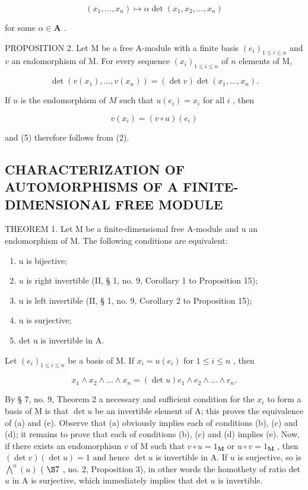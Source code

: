 \[
(x _ {1}, \dots , x _ {n}) \mapsto \alpha \det (x _ {1}, x _ {2}, \dots , x _ {n})
\]

for some \(\alpha \in \mathbf{A}\) .

PROPOSITION 2. Let M be a free A-module with a finite basis \((e_i)_{1 \leqslant i \leqslant n}\) and \(v\) an endomorphism of M. For every sequence \((x_i)_{1 \leqslant i \leqslant n}\) of \(n\) elements of M,

\[
\det (v (x _ {1}), \dots , v (x _ {n})) = (\det v) \det (x _ {1}, \dots , x _ {n}).\tag{5}
\]

If \(u\) is the endomorphism of \(M\) such that \(u(e_i) = x_i\) for all \(i\) , then

\[
v (x _ {i}) = (v \circ u) (e _ {i})
\]

and (5) therefore follows from (2).

\subsection{CHARACTERIZATION OF AUTOMORPHISMS OF A FINITE-DIMENSIONAL FREE MODULE}

THEOREM 1. Let M be a finite-dimensional free A-module and u an endomorphism of M. The following conditions are equivalent:

\begin{enumerate}
\def\labelenumi{(\alph{enumi})}
\item
  u is bijective;
\item
  \(u\) is right invertible (II, § 1, no. 9, Corollary 1 to Proposition 15);
\item
  u is left invertible (II, § 1, no. 9, Corollary 2 to Proposition 15);
\item
  u is surjective;
\item
  det u is invertible in A.
\end{enumerate}

Let \((e_i)_{1\leqslant i\leqslant n}\) be a basis of M. If \(x_{i} = u(e_{i})\) for \(1\leqslant i\leqslant n\) , then

\[
x _ {1} \wedge x _ {2} \wedge \dots \wedge x _ {n} = (\det u) e _ {1} \wedge e _ {2} \wedge \dots \wedge e _ {n}.
\]

By § 7, no. 9, Theorem 2 a necessary and sufficient condition for the \(x_{i}\) to form a basis of M is that \(\det u\) be an invertible element of A; this proves the equivalence of (a) and (e). Observe that (a) obviously implies each of conditions (b), (c) and (d); it remains to prove that each of conditions (b), (c) and (d) implies (e). Now, if there exists an endomorphism \(v\) of M such that \(v \circ u = 1_{\mathbf{M}}\) or \(u \circ v = 1_{\mathbf{M}}\) , then \((\det v)(\det u) = 1\) and hence \(\det u\) is invertible in A. If \(u\) is surjective, so is \(\bigwedge^{n}(u)\) ( \(\S 7\) , no. 2, Proposition 3), in other words the homothety of ratio det \(u\) in A is surjective, which immediately implies that det \(u\) is invertible.

